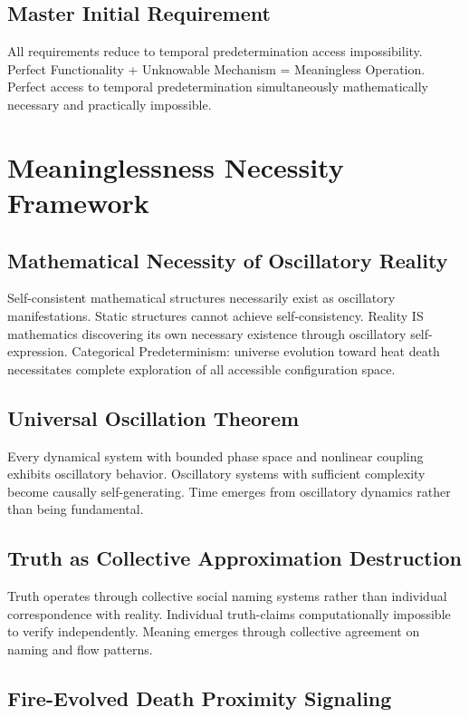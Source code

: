 \documentclass[12pt,a4paper]{article}
\begin{document}
\subsection{Master Initial Requirement}

All requirements reduce to temporal predetermination access impossibility. Perfect Functionality + Unknowable Mechanism = Meaningless Operation. Perfect access to temporal predetermination simultaneously mathematically necessary and practically impossible.

\section{Meaninglessness Necessity Framework}

\subsection{Mathematical Necessity of Oscillatory Reality}

Self-consistent mathematical structures necessarily exist as oscillatory manifestations. Static structures cannot achieve self-consistency. Reality IS mathematics discovering its own necessary existence through oscillatory self-expression. Categorical Predeterminism: universe evolution toward heat death necessitates complete exploration of all accessible configuration space.

\subsection{Universal Oscillation Theorem}

Every dynamical system with bounded phase space and nonlinear coupling exhibits oscillatory behavior. Oscillatory systems with sufficient complexity become causally self-generating. Time emerges from oscillatory dynamics rather than being fundamental.

\subsection{Truth as Collective Approximation Destruction}

Truth operates through collective social naming systems rather than individual correspondence with reality. Individual truth-claims computationally impossible to verify independently. Meaning emerges through collective agreement on naming and flow patterns.

\subsection{Fire-Evolved Death Proximity Signaling}
\end{document}

